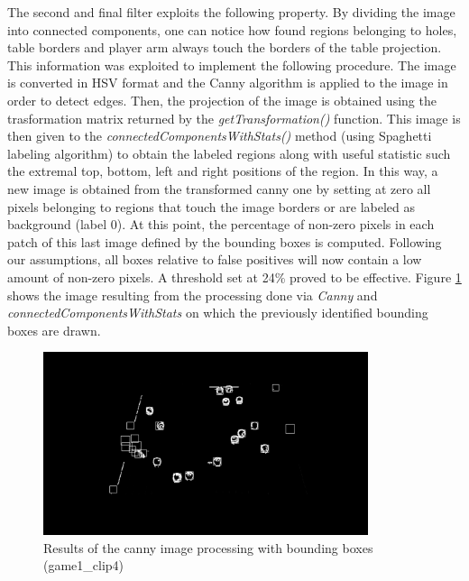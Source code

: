 The second and final filter exploits the following property. By dividing the image into connected components, one can notice how found regions belonging to holes, table borders and player arm always
touch the borders of the table projection. This information was exploited to implement the following procedure.
The image is converted in HSV format and the Canny algorithm is applied to the image in order to detect edges.
Then, the projection of the image is obtained using the trasformation matrix returned by the \textit{getTransformation()} function.
This image is then given to the \textit{connectedComponentsWithStats()} method (using Spaghetti labeling algorithm) to obtain
the labeled regions along with useful statistic such the extremal top, bottom, left and right positions of the region.
In this way, a new image is obtained from the transformed canny one by setting at zero all pixels belonging to regions that touch the image
borders or are labeled as background (label 0).
At this point, the percentage of non-zero pixels in each patch of this last image defined by the bounding boxes is computed.
Following our assumptions, all boxes relative to false positives will now contain a low amount of non-zero pixels.
A threshold set at 24\% proved to be effective. Figure \ref{fig:cannyprocess} shows the image resulting from the processing done via \textit{Canny} and \textit{connectedComponentsWithStats}
on which the previously identified bounding boxes are drawn. \\
\begin{figure}[h!]
    \centering
    \includegraphics[width=0.85\textwidth]{imgs/ball_localization/conn_comp1.jpg}
    \caption{Results of the canny image processing with bounding boxes (game1\_clip4)}
    \label{fig:cannyprocess}
\end{figure}

